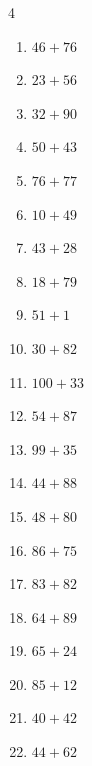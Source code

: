 \begin{multicols}{4}
\begin{enumerate}
  \item $46+76$
        \phantom{$=122$}

  \item $23+56$
        \phantom{$=79$}

  \item $32+90$
        \phantom{$=122$}

  \item $50+43$
        \phantom{$=93$}

  \item $76+77$
        \phantom{$=153$}

  \item $10+49$
        \phantom{$=59$}

  \item $43+28$
        \phantom{$=71$}

  \item $18+79$
        \phantom{$=97$}

  \item $51+1$
        \phantom{$=52$}

  \item $30+82$
        \phantom{$=112$}

  \item $100+33$
        \phantom{$=133$}

  \item $54+87$
        \phantom{$=141$}

  \item $99+35$
        \phantom{$=134$}

  \item $44+88$
        \phantom{$=132$}

  \item $48+80$
        \phantom{$=128$}

  \item $86+75$
        \phantom{$=161$}

  \item $83+82$
        \phantom{$=165$}

  \item $64+89$
        \phantom{$=153$}

  \item $65+24$
        \phantom{$=89$}

  \item $85+12$
        \phantom{$=97$}

  \item $40+42$
        \phantom{$=82$}

  \item $44+62$
        \phantom{$=106$}


\end{enumerate}
\end{multicols}
